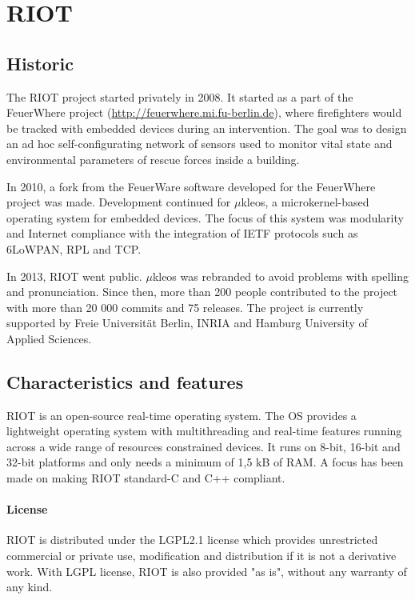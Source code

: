 \section{RIOT}

\subsection{Historic}

The RIOT project started privately in 2008.
It started as a part of the FeuerWhere project (\url{http://feuerwhere.mi.fu-berlin.de}), 
    where firefighters would be tracked with embedded devices during an intervention.
The goal was to design an ad hoc self-configurating network of sensors used 
    to monitor vital state and environmental parameters of rescue forces inside a building.

In 2010, a fork from the FeuerWare software developed for the FeuerWhere project was made.
Development continued for $\mu$kleos\cite{microkleos}, a microkernel-based operating system for embedded devices.
The focus of this system was modularity and Internet compliance with the integration of IETF protocols such as 6LoWPAN, RPL and TCP.

In 2013, RIOT went public.
$\mu$kleos was rebranded to avoid problems with spelling and pronunciation.
Since then, more than 200 people contributed to the project with more than 20 000 commits and 75 releases.
The project is currently supported by Freie Universität Berlin, INRIA and Hamburg University of Applied Sciences.

\subsection{Characteristics and features}
RIOT is an open-source real-time operating system.
The OS provides a lightweight operating system with multithreading and real-time features running across a wide range of resources constrained devices.
It runs on 8-bit, 16-bit and 32-bit platforms and only needs a minimum of 1,5 kB of RAM.
A focus has been made on making RIOT standard-C and C++ compliant.

\paragraph{License} RIOT is distributed under the LGPL2.1 license which provides unrestricted commercial or private use, modification and distribution if it is not a derivative work.
With LGPL license, RIOT is also provided "as is", without any warranty of any kind.

